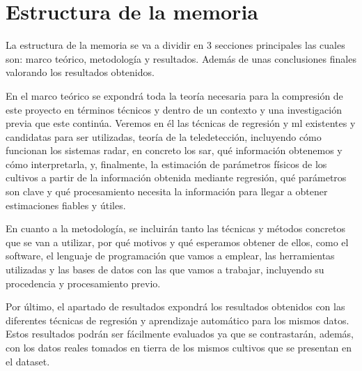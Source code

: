\section{Estructura de la memoria}
\par La estructura de la memoria se va a dividir en 3 secciones principales las cuales son: marco teórico, metodología y resultados. Además de unas conclusiones finales valorando los resultados obtenidos.
\\
\par En el marco teórico se expondrá toda la teoría necesaria para la compresión de este proyecto en términos técnicos y dentro de un contexto y una investigación previa que este continúa. Veremos en él las técnicas de regresión y \gls{ml} existentes y candidatas para ser utilizadas, teoría de la teledetección, incluyendo cómo funcionan los sistemas radar, en concreto los \gls{sar}, qué información obtenemos y cómo interpretarla, y, finalmente, la estimación de parámetros físicos de los cultivos a partir de la información obtenida mediante regresión, qué parámetros son clave y qué procesamiento necesita la información para llegar a obtener estimaciones fiables y útiles. 
\\
\par En cuanto a la metodología, se incluirán tanto las técnicas y métodos concretos que se van a utilizar, por qué motivos y qué esperamos obtener de ellos, como el software, el lenguaje de programación que vamos a emplear, las herramientas utilizadas y las bases de datos con las que vamos a trabajar, incluyendo su procedencia y procesamiento previo. 
\\
\par Por último, el apartado de resultados expondrá los resultados obtenidos con las diferentes técnicas de regresión y aprendizaje automático para los mismos datos. Estos resultados podrán ser fácilmente evaluados ya que se contrastarán, además, con los datos reales tomados en tierra de los mismos cultivos que se presentan en el dataset. 
